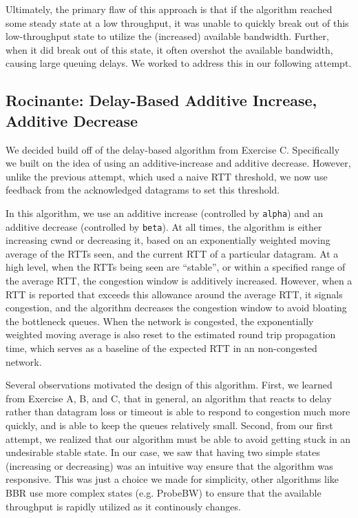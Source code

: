 \documentclass[twoside]{article}
\begin{document}
Ultimately, the primary flaw of this approach is that if the algorithm reached
some steady state at a low throughput, it was unable to quickly break out of
this low-throughput state to utilize the (increased) available bandwidth. Further,
when it did break out of this state, it often overshot the available bandwidth, causing
large queuing delays. We worked to address this in our following attempt.

\subsection*{Rocinante: Delay-Based Additive Increase, Additive Decrease}

We decided build off of the delay-based algorithm from
Exercise C. Specifically we built on the idea of using an additive-increase
and additive decrease. However, unlike the previous attempt, which used a
naive RTT threshold, we now use feedback from the acknowledged datagrams to set
this threshold.

In this algorithm, we use an additive increase (controlled by \texttt{alpha})
and an additive decrease (controlled by \texttt{beta}). At all times, the
algorithm is either increasing cwnd or decreasing it, based on an
exponentially weighted moving average of the RTTs seen, and the current RTT
of a particular datagram. At a high level, when the RTTs being seen are
``stable'', or within a specified range of the average RTT, the congestion
window is additively increased. However, when a RTT is reported that exceeds
this allowance around the average RTT, it signals congestion, and the algorithm
decreases the congestion window to avoid bloating the bottleneck queues.
When the network is congested, the exponentially weighted moving average is
also reset to the estimated round trip propagation time, which serves as a
baseline of the expected RTT in an non-congested network.

Several observations motivated the design of this algorithm. First, we learned
from Exercise A, B, and C, that in general, an algorithm that reacts to delay
rather than datagram loss or timeout is able to respond to congestion much more
quickly, and is able to keep the queues relatively small.
Second, from our first attempt, we realized that our algorithm must be able
to avoid getting stuck in an undesirable stable state. In our case, we saw
that having two simple states (increasing or decreasing) was an intuitive way
ensure that the algorithm was responsive. This was just a choice we made for
simplicity, other algorithms like BBR use more complex states (e.g. ProbeBW) to
ensure that the available throughput is rapidly utilized as it continously changes.
\end{document}
